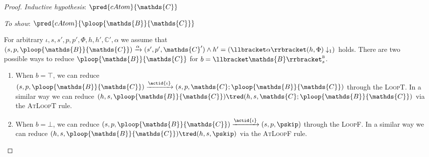 \begin{lem}
{\begin{proof}
	\textit{Inductive hypothesis}: $\pred{cAtom}{\mathds{C}}$
	
	\textit{To show}: $\pred{cAtom}{\ploop{\mathds{B}}{\mathds{C}}}$
	
	For arbitrary $\iota, s, s', p, p', \Phi, h, h', \mathds{C}', \alpha$ we assume that $(s, p, \ploop{\mathds{B}}{\mathds{C}}) \xrightarrow{\alpha} (s', p', \mathds{C}') \land h' = \left( \llbracket \alpha \rrbracket(h, \Phi) \downarrow_1 \right)$ holds. There are two possible ways to reduce $\ploop{\mathds{B}}{\mathds{C}}$ for $b = \llbracket \mathds{B} \rrbracket_{s}^{\textsc{b}}$.
	\begin{enumerate}
	\item When $b = \top$, we can reduce $(s, p, \ploop{\mathds{B}}{\mathds{C}}) \xrightarrow{\actid{\iota}} (s, p, \mathds{C} ; \ploop{\mathds{B}}{\mathds{C}})$ through the \textsc{LoopT}. In a similar way we can reduce $(h, s, \ploop{\mathds{B}}{\mathds{C}}) \tred (h, s, \mathds{C} ; \ploop{\mathds{B}}{\mathds{C}})$ via the \textsc{AtLoopT} rule.
	\item When $b = \bot$, we can reduce $(s, p, \ploop{\mathds{B}}{\mathds{C}}) \xrightarrow{\actid{\iota}} (s, p, \pskip)$ through the \textsc{LoopF}. In a similar way we can reduce $(h, s, \ploop{\mathds{B}}{\mathds{C}}) \tred (h, s, \pskip)$ via the \textsc{AtLoopF} rule.
	\end{enumerate}
	\end{proof}
	}
\end{lem}

